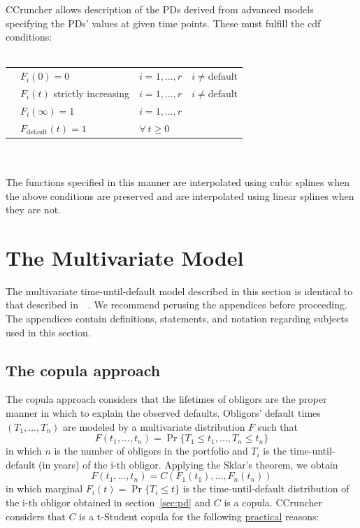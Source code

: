 \documentclass[11pt,fleqn]{book} %
\begin{document}
CCruncher allows description of the PDs derived from advanced models specifying 
the PDs' values at given time points. These must fulfill the cdf conditions:
~\\
~\\
\begin{listliketab} 
	\begin{tabular}{Lll}
		\textbullet & $F_i(0) = 0$                 & $i=1,\dots,r \quad i \ne \text{default}$ \\
		\textbullet & $F_i(t)$ strictly increasing & $i=1,\dots,r \quad i \ne \text{default}$ \\
		\textbullet & $F_i(\infty) = 1$            & $i=1,\dots,r$ \\
		\textbullet & $F_{\text{default}}(t) = 1$  & $\forall\ t \ge 0$ \\
	\end{tabular} 
\end{listliketab}
~\\
~\\
The functions specified in this manner are interpolated using cubic splines
when the above conditions are preserved and are interpolated using linear 
splines when they are not.

\section{The Multivariate Model}

The multivariate time-until-default model described in this section is identical
to that described in~\cite{li:2000,roncalli:2001,frey:2001}~\cite[chap. 2.6]{bluhm:2002}.
We recommend perusing the appendices before proceeding. The appendices contain 
definitions, statements, and notation regarding subjects used in this section.

\subsection{The copula approach}
The copula approach considers that the lifetimes of obligors are the proper 
manner in which to explain the observed defaults. Obligors' default times 
$(T_1,\dots,T_n)$ are modeled by a multivariate distribution $F$ such that
\begin{displaymath}
	F(t_1, \dots, t_n) = \Pr \{T_1 \le t_1, \dots, T_n \le t_n\}
\end{displaymath}
in which $n$ is the number of obligors in the portfolio and $T_i$ is the 
time-until-default (in years) of the i-th obligor. Applying the Sklar's 
theorem, we obtain
\begin{displaymath}
	F(t_1, \dots, t_n) = 
	C\left(F_1(t_1), \dots, F_n(t_n)\right)
\end{displaymath}
in which marginal $F_i(t) = \Pr\{T_i \le t\}$ is the time-until-default 
distribution of the i-th obligor obtained in section~\ref{sec:pd} and $C$ 
is a copula. CCruncher considers that $C$ is a t-Student copula for the 
following \ul{practical} reasons:
\end{document}
